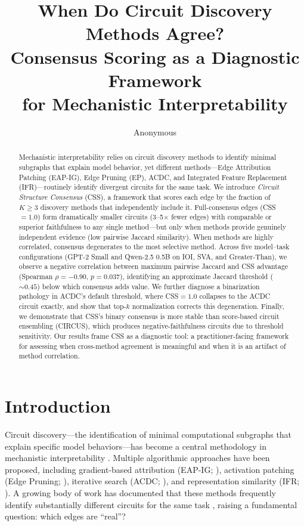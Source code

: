 \documentclass[11pt,a4paper]{article}
\title{When Do Circuit Discovery Methods Agree?\\Consensus Scoring as a Diagnostic Framework\\for Mechanistic Interpretability}
\author{Anonymous}
\date{}
\newcommand{\css}{\textsc{CSS}}
\begin{document}
\maketitle

\begin{abstract}
Mechanistic interpretability relies on circuit discovery methods to identify minimal subgraphs that explain model behavior, yet different methods---Edge Attribution Patching (EAP-IG), Edge Pruning (EP), ACDC, and Integrated Feature Replacement (IFR)---routinely identify divergent circuits for the same task.
We introduce \emph{Circuit Structure Consensus} (\css{}), a framework that scores each edge by the fraction of $K\!\geq\!3$ discovery methods that independently include it.
Full-consensus edges (\css{}$=1.0$) form dramatically smaller circuits (3--5$\times$ fewer edges) with comparable or superior faithfulness to any single method---but only when methods provide genuinely independent evidence (low pairwise Jaccard similarity).
When methods are highly correlated, consensus degenerates to the most selective method.
Across five model--task configurations (GPT-2 Small and Qwen-2.5 0.5B on IOI, SVA, and Greater-Than), we observe a negative correlation between maximum pairwise Jaccard and \css{} advantage (Spearman $\rho=-0.90$, $p=0.037$), identifying an approximate Jaccard threshold (${\sim}0.45$) below which consensus adds value.
We further diagnose a binarization pathology in ACDC's default threshold, where \css{}$=1.0$ collapses to the ACDC circuit exactly, and show that top-$k$ normalization corrects this degeneration.
Finally, we demonstrate that \css{}'s binary consensus is more stable than score-based circuit ensembling (CIRCUS), which produces negative-faithfulness circuits due to threshold sensitivity.
Our results frame \css{} as a diagnostic tool: a practitioner-facing framework for assessing when cross-method agreement is meaningful and when it is an artifact of method correlation.
\end{abstract}

\section{Introduction}
\label{sec:intro}

Circuit discovery---the identification of minimal computational subgraphs that explain specific model behaviors---has become a central methodology in mechanistic interpretability \cite{elhage2021mathematical,conmy2023towards,wang2023interpretability}.
Multiple algorithmic approaches have been proposed, including gradient-based attribution (EAP-IG; \cite{syed2023attribution}), activation patching (Edge Pruning; \cite{bhaskar2024finding}), iterative search (ACDC; \cite{conmy2023towards}), and representation similarity (IFR; \cite{hanna2024have}).
A growing body of work has documented that these methods frequently identify substantially different circuits for the same task \cite{mondorf2025from}, raising a fundamental question: which edges are ``real''?
\end{document}
